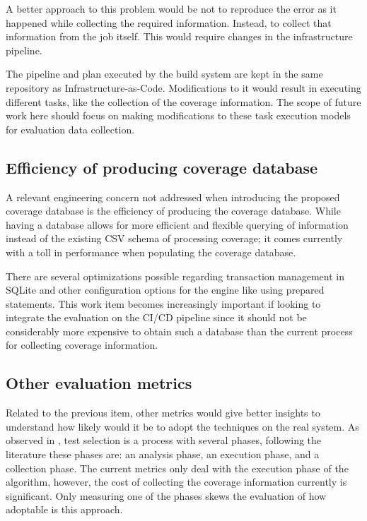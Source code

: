 \documentclass{article}
\begin{document}
A better approach to this problem would be not to reproduce the error as it happened while collecting the required information. Instead, to collect that information from the job itself. This would require changes in the infrastructure pipeline.

The pipeline and plan executed by the build system are kept in the same repository as Infrastructure-as-Code. Modifications to it would result in executing different tasks, like the collection of the coverage information.
 The scope of future work here should focus on making modifications to these task execution models for evaluation data collection.

\subsection{Efficiency of producing coverage database}
A relevant engineering concern not addressed when introducing the proposed coverage database is the efficiency of producing the coverage database. While having a database allows for more efficient and flexible querying of information instead of the existing CSV schema of processing coverage; it comes currently with a toll in performance when populating the coverage database.

There are several optimizations possible regarding transaction management in SQLite and other configuration options for the engine like using prepared statements. This work item becomes increasingly important if looking to integrate the evaluation on the CI/CD pipeline since it should not be considerably more expensive to obtain such a database than the current process for collecting coverage information.

\subsection{Other evaluation metrics}
Related to the previous item, other metrics would give better insights to understand how likely would it be to adopt the techniques on the real system. As observed in \cite{10.1109/ICSE.2019.00055}, test selection is a process with several phases, following the literature these phases are: an analysis phase, an execution phase, and a collection phase. The current metrics only deal with the execution phase of the algorithm, however, the cost of collecting the coverage information currently is significant. Only measuring one of the phases skews the evaluation of how adoptable is this approach.
\end{document}

